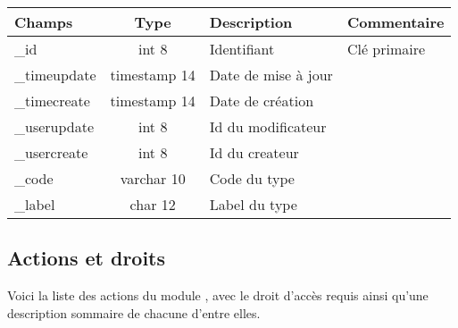 \begin{tabular}{|p{3cm}|c|p{5.4cm}|p{2.6cm}|}
\hline
\textbf{Champs} & \textbf{Type} & \textbf{Description} & \textbf{Commentaire} \\
\hline
\_id & int 8 & Identifiant & Clé primaire \\
\hline
\_timeupdate & timestamp 14 & Date de mise à jour & \\
\hline
\_timecreate & timestamp 14 & Date de création & \\
\hline
\_userupdate & int 8 & Id du modificateur & \\
\hline
\_usercreate & int 8 & Id du createur & \\
\hline
\_code & varchar 10 & Code du type & \\
\hline
\_label & char 12 & Label du type & \\
\hline
\end{tabular}


\subsection{Actions et droits}

Voici la liste des actions du module \company, avec le droit d'accès requis ainsi qu'une description sommaire de chacune d'entre elles.\\

